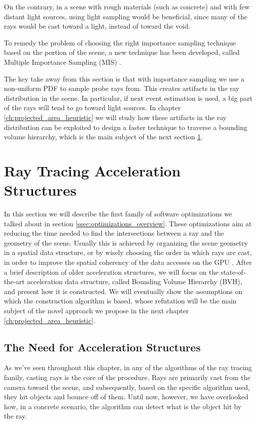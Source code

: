 \documentclass{PoliMi_MasterThesis}
\begin{document}
On the contrary, in a scene with rough materials (such as concrete) and with few distant light sources, using light sampling would be beneficial, since many of the rays would be cast toward a light, instead of toward the void.

To remedy the problem of choosing the right importance sampling technique based on the portion of the scene, a new technique has been developed, called Multiple Importance Sampling (MIS) \cite{mis}.

The key take away from this section is that with importance sampling we use a non-uniform PDF to sample probe rays from. This creates artifacts in the ray distribution in the scene. In particular, if next event estimation is used, a big part of the rays will tend to go toward light sources. In chapter \ref{ch:projected_area_heuristic} we will study how these artifacts in the ray distribution can be exploited to design a faster technique to traverse a bounding volume hierarchy, which is the main subject of the next section \ref{sec:ray_tracing_acceleration_structures}.

\section{Ray Tracing Acceleration Structures} \label{sec:ray_tracing_acceleration_structures}
In this section we will describe the first family of software optimizations we talked about in section \ref{ssec:optimizations_overview}. These optimizations aim at reducing the time needed to find the intersections between a ray and the geometry of the scene. Usually this is achieved by organizing the scene geometry in a spatial data structure, or by wisely choosing the order in which rays are cast, in order to improve the spatial coherency of the data accesses on the GPU \cite{ray_coherency}. After a brief description of older acceleration structures, we will focus on the state-of-the-art acceleration data structure, called Bounding Volume Hierarchy (BVH), and present how it is constructed. We will eventually show the assumptions on which the construction algorithm is based, whose refutation will be the main subject of the novel approach we propose in the next chapter \ref{ch:projected_area_heuristic}.

\subsection{The Need for Acceleration Structures} \label{ssec:need_for_acceleration_structures}
As we've seen throughout this chapter, in any of the algorithms of the ray tracing family, casting rays is the core of the procedure. Rays are primarily cast from the camera toward the scene, and subsequently, based on the specific algorithm used, they hit objects and bounce off of them. Until now, however, we have overlooked how, in a concrete scenario, the algorithm can detect what is the object hit by the ray. 
\end{document}
